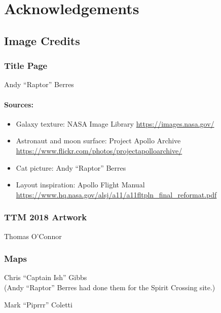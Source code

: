 \chapter{Acknowledgements}
\section*{Image Credits}

\subsection*{Title Page} 
Andy ``Raptor'' Berres

\subsubsection*{Sources:}
\begin{itemize}[noitemsep]
  \item Galaxy texture: NASA Image Library \url{https://images.nasa.gov/}
  \item Astronaut and moon surface: Project Apollo Archive \url{https://www.flickr.com/photos/projectapolloarchive/}
  \item Cat picture: Andy ``Raptor'' Berres
  \item Layout inspiration: Apollo Flight Manual \url{https://www.hq.nasa.gov/alsj/a11/a11fltpln_final_reformat.pdf}
\end{itemize}
\vfill\null

\subsection*{TTM 2018 Artwork}
Thomas O'Connor

\subsection*{Maps}
\begin{description}[leftmargin=6em,noitemsep,style=nextline]
	\item[Direction maps:] Chris ``Captain Ish'' Gibbs \\
	(Andy ``Raptor'' Berres had done them for the Spirit Crossing site.)
	\item[Inside and outside back cover maps:] Mark ``Piprrr'' Coletti
\end{description}

